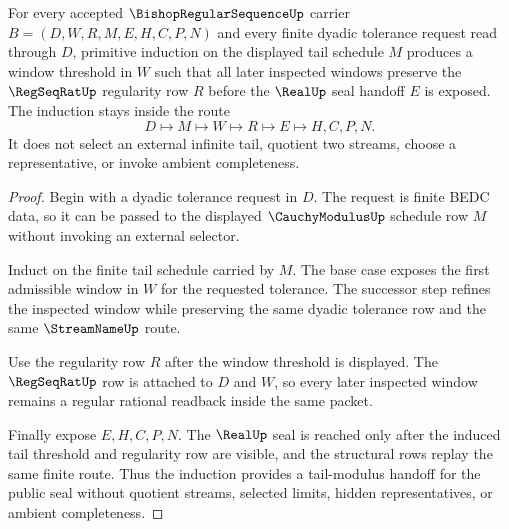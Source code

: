 \begin{theorem}
\label{thm:bishop-regular-sequence-tail-modulus-induction}
For every accepted $\BishopRegularSequenceUp$ carrier $B=(D,W,R,M,E,H,C,P,N)$ and every finite dyadic tolerance request read through $D$, primitive induction on the displayed tail schedule $M$ produces a window threshold in $W$ such that all later inspected windows preserve the $\RegSeqRatUp$ regularity row $R$ before the $\RealUp$ seal handoff $E$ is exposed. The induction stays inside the route
$$
D \longmapsto M \longmapsto W \longmapsto R \longmapsto E \longmapsto H,C,P,N .
$$
It does not select an external infinite tail, quotient two streams, choose a representative, or invoke ambient completeness.
\end{theorem}
\begin{proof}
Begin with a dyadic tolerance request in $D$. The request is finite BEDC data, so it can be passed to the displayed $\CauchyModulusUp$ schedule row $M$ without invoking an external selector.

Induct on the finite tail schedule carried by $M$. The base case exposes the first admissible window in $W$ for the requested tolerance. The successor step refines the inspected window while preserving the same dyadic tolerance row and the same $\StreamNameUp$ route.

Use the regularity row $R$ after the window threshold is displayed. The $\RegSeqRatUp$ row is attached to $D$ and $W$, so every later inspected window remains a regular rational readback inside the same packet.

Finally expose $E,H,C,P,N$. The $\RealUp$ seal is reached only after the induced tail threshold and regularity row are visible, and the structural rows replay the same finite route. Thus the induction provides a tail-modulus handoff for the public seal without quotient streams, selected limits, hidden representatives, or ambient completeness.
\end{proof}



